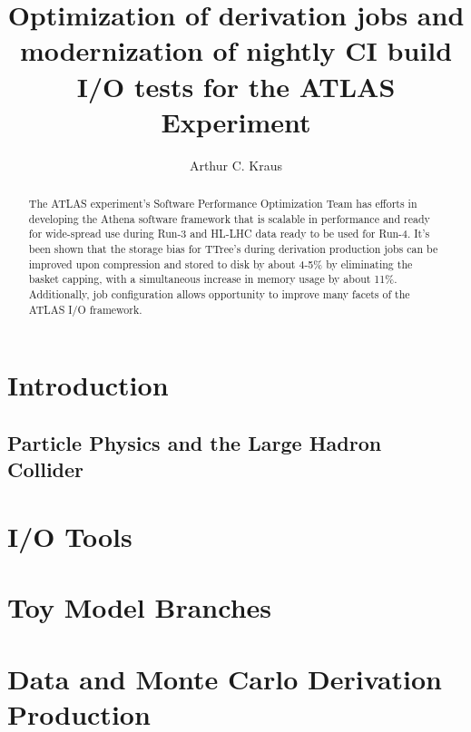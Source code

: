 \documentclass[12pt]{niuthesis}
\title{Optimization of derivation jobs and modernization of nightly CI build I/O tests for the ATLAS Experiment}
\author{Arthur C. Kraus}
\begin{document}
\begin{abstract}
The ATLAS experiment's Software Performance Optimization Team has efforts in developing the Athena software framework that is scalable in performance and ready for wide-spread use during Run-3 and HL-LHC data ready to be used for Run-4. It's been shown that the storage bias for TTree's during derivation production jobs can be improved upon compression and stored to disk by about 4-5\% by eliminating the basket capping, with a simultaneous increase in memory usage by about 11\%. Additionally, job configuration allows opportunity to improve many facets of the ATLAS I/O framework. 
\end{abstract}

\begin{dedication}

\end{dedication}

\begin{acknowledgements}

\end{acknowledgements}
\MakeThesisPrologue




\chapter{Introduction}
\section{Particle Physics and the Large Hadron Collider}


\chapter{I/O Tools}


\chapter{Toy Model Branches}


\chapter{Data and Monte Carlo Derivation Production}

\end{document}
